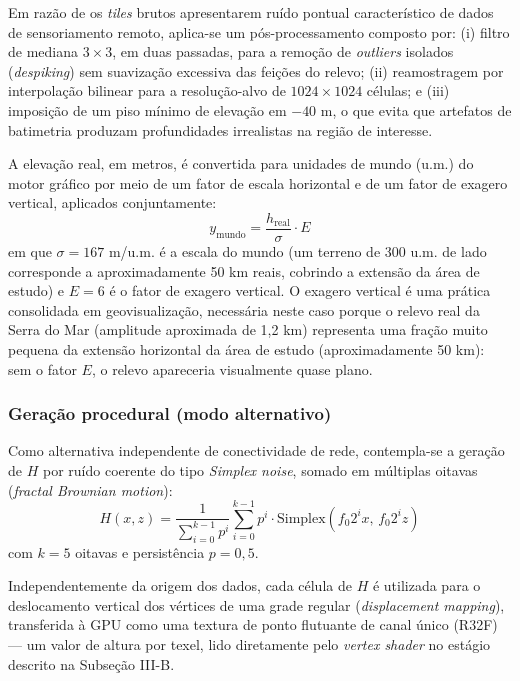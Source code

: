 \documentclass[conference]{IEEEtran}
\begin{document}
Em razão de os \emph{tiles} brutos apresentarem ruído pontual
característico de dados de sensoriamento remoto, aplica-se um
pós-processamento composto por: (i) filtro de mediana $3 \times 3$, em
duas passadas, para a remoção de \emph{outliers} isolados
(\emph{despiking}) sem suavização excessiva das feições do relevo; (ii)
reamostragem por interpolação bilinear para a resolução-alvo de
$1024 \times 1024$ células; e (iii) imposição de um piso mínimo de
elevação em $-40$ m, o que evita que artefatos de batimetria produzam
profundidades irrealistas na região de interesse.

A elevação real, em metros, é convertida para unidades de mundo (u.m.) do
motor gráfico por meio de um fator de escala horizontal e de um fator de
exagero vertical, aplicados conjuntamente:
\begin{equation}
y_{\text{mundo}} = \frac{h_{\text{real}}}{\sigma} \cdot E
\label{eq:escala}
\end{equation}
em que $\sigma = 167$ m/u.m. é a escala do mundo (um terreno de 300 u.m.
de lado corresponde a aproximadamente 50 km reais, cobrindo a extensão da
área de estudo) e $E = 6$ é o fator de exagero vertical. O exagero
vertical é uma prática consolidada em geovisualização, necessária neste
caso porque o relevo real da Serra do Mar (amplitude aproximada de
1,2 km) representa uma fração muito pequena da extensão horizontal da
área de estudo (aproximadamente 50 km): sem o fator $E$, o relevo
apareceria visualmente quase plano.

\subsubsection{Geração procedural (modo alternativo)}
Como alternativa
independente de conectividade de rede, contempla-se a geração de $H$ por
ruído coerente do tipo \emph{Simplex noise}, somado em múltiplas oitavas
(\emph{fractal Brownian motion}):
\begin{equation}
H(x,z) = \frac{1}{\sum_{i=0}^{k-1} p^i} \sum_{i=0}^{k-1} p^i \cdot
\text{Simplex}(f_0 2^i x,\, f_0 2^i z)
\label{eq:fbm}
\end{equation}
com $k = 5$ oitavas e persistência $p = 0{,}5$.

Independentemente da origem dos dados, cada célula de $H$ é utilizada
para o deslocamento vertical dos vértices de uma grade regular
(\emph{displacement mapping}), transferida à GPU como uma textura de
ponto flutuante de canal único (R32F) --- um valor de altura por texel,
lido diretamente pelo \emph{vertex shader} no estágio descrito na
Subseção III-B.
\end{document}
